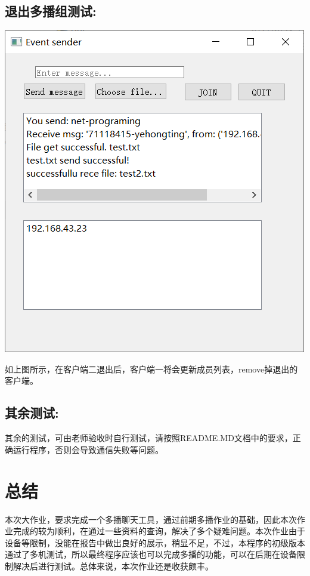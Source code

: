 \documentclass[UTF8]{ctexart}
\begin{document}
\subsection{退出多播组测试: }
\par\centerline{\includegraphics[scale=0.5]{QUIT.png}}
\par{如上图所示，在客户端二退出后，客户端一将会更新成员列表，remove掉退出的客户端。}
\subsection{其余测试: }{其余的测试，可由老师验收时自行测试，请按照README.MD文档中的要求，正确运行程序，否则会导致通信失败等问题。}

\section{总结}
\par{本次大作业，要求完成一个多播聊天工具，通过前期多播作业的基础，因此本次作业完成的较为顺利，在通过一些资料的查询，解决了多个疑难问题。本次作业由于设备等限制，没能在报告中做出良好的展示，稍显不足，不过，本程序的初级版本通过了多机测试，所以最终程序应该也可以完成多播的功能，可以在后期在设备限制解决后进行测试。总体来说，本次作业还是收获颇丰。}
\end{document}
